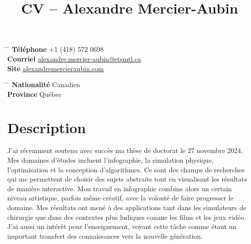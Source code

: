 \documentclass[10pt]{article} %
\begin{document}

\title{CV -- Alexandre Mercier-Aubin} %


\parbox{0.5\textwidth}{ %
\begin{tabbing} %
\hspace{3cm} \= \hspace{4cm} \= \kill %
{\bf Téléphone} \> +1 (418) 572 0698 \\ %
{\bf Courriel} \> \href{mailto:alexandre.mercier-aubin@etsmtl.ca}{alexandre.mercier-aubin@etsmtl.ca} \\ %
{\bf Site} \> \href{https://alexandremercieraubin.com}{alexandremercieraubin.com} \\
\end{tabbing}}
\hfill %
\parbox{0.5\textwidth}{ %
\begin{tabbing} %
\hspace{3cm} \= \hspace{4cm} \= \kill %
{\bf Nationalité} \> Canadien \\ %
{\bf Province} \> {Québec}\\
\end{tabbing}}

\vspace{-0.7cm} 

\justifying

\section{Description}

J'ai récemment soutenu avec succès ma thèse de doctorat le 27 novembre 2024. Mes domaines d'études incluent l'infographie, la simulation physique, l'optimisation et la conception d'algorithmes. Ce sont des champs de recherches qui me permettent de choisir des sujets abstraits tout en visualisant les résultats de manière interactive. Mon travail en infographie combine alors un certain niveau artistique, parfois même créatif, avec la volonté de faire progresser le domaine. Mes résultats ont mené à des applications tant dans les simulateurs de chirurgie que dans des contextes plus ludiques comme les films et les jeux vidéo. J'ai aussi un intérêt pour l'enseignement, voyant cette tâche comme étant un important transfert des connaissances vers la nouvelle génération.
\end{document}
